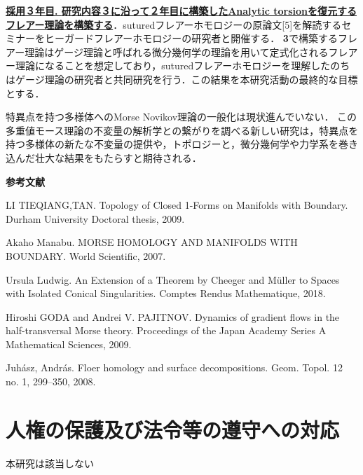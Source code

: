 \documentclass[11pt,a4j,dvipdfmx]{jarticle} 					%
\newcommand{\研究課題名}{象の卵}
\newcommand{\研究機関名}{京都大学}
\newcommand{\研究代表者氏名}{福士　謙二　　　}
\begin{document}
\noindent
\textbf{\ul{採用３年目. }}\textbf{\ul{研究内容３に沿って２年目に構築したAnalytic torsionを復元するフレアー理論を構築する}}．suturedフレアーホモロジーの原論文[5]を解読するセミナーをヒーガードフレアーホモロジーの研究者と開催する．
\textbf{3}で構築するフレアー理論はゲージ理論と呼ばれる微分幾何学の理論を用いて定式化されるフレアー理論になることを想定しており，suturedフレアーホモロジーを理解したのちはゲージ理論の研究者と共同研究を行う．この結果を本研究活動の最終的な目標とする．


\noindent
{}

特異点を持つ多様体へのMorse Novikov理論の一般化は現状進んでいない．
この多重値モース理論の不変量の解析学との繋がりを調べる新しい研究は，特異点を持つ多様体の新たな不変量の提供や，トポロジーと，微分幾何学や力学系を巻き込んだ壮大な結果をもたらすと期待される．



\vspace{2mm}
\noindent \textbf{参考文献}

\noindent
[1] LI TIEQIANG,TAN. Topology of Closed 1-Forms on Manifolds with Boundary. Durham University Doctoral thesis, 2009.


\noindent
[2] Akaho Manabu. MORSE HOMOLOGY AND MANIFOLDS WITH BOUNDARY. World Scientific, 2007.

\noindent
[3] Ursula Ludwig. An Extension of a Theorem by Cheeger and M\"{u}ller to Spaces with Isolated Conical Singularities. Comptes Rendus Mathematique, 2018.

\noindent
[4] Hiroshi GODA and Andrei V. PAJITNOV. Dynamics of gradient flows in the half-transversal Morse theory. Proceedings of the Japan Academy Series A Mathematical Sciences, 2009.

\noindent
[5] Juhász, András. Floer homology and surface decompositions. Geom. Topol. 12 no. 1, 299–350, 2008.





\section{人権の保護及び法令等の遵守への対応}

\noindent
本研究は該当しない
\end{document}
